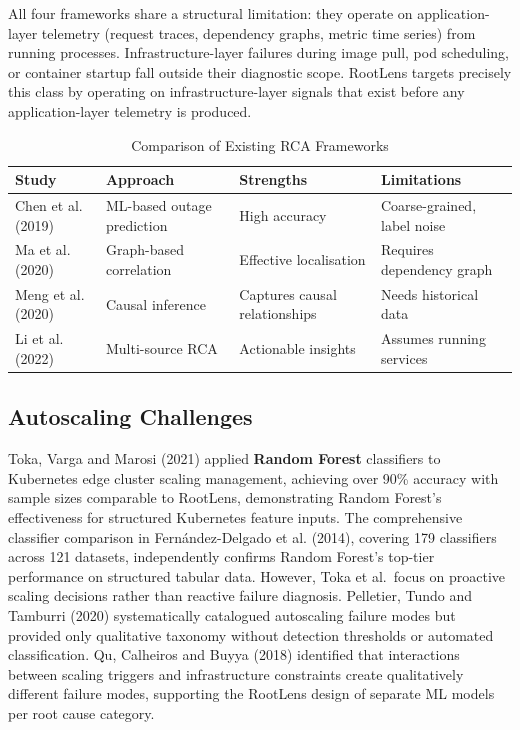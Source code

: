 All four frameworks share a structural limitation: they operate on application-layer telemetry (request traces, dependency graphs, metric time series) from running processes. Infrastructure-layer failures during image pull, pod scheduling, or container startup fall outside their diagnostic scope. RootLens targets precisely this class by operating on infrastructure-layer signals that exist before any application-layer telemetry is produced.

\begin{table}[H]
\centering
\begin{tabularx}{\textwidth}{|X|X|X|X|}
\hline
\textbf{Study} & \textbf{Approach} & \textbf{Strengths} & \textbf{Limitations} \\ \hline

Chen et al. (2019) & ML-based outage prediction & High accuracy & Coarse-grained, label noise \\ \hline

Ma et al. (2020) & Graph-based correlation & Effective localisation & Requires dependency graph \\ \hline

Meng et al. (2020) & Causal inference & Captures causal relationships & Needs historical data \\ \hline

Li et al. (2022) & Multi-source RCA & Actionable insights & Assumes running services \\ \hline

\end{tabularx}
\caption{Comparison of Existing RCA Frameworks}
\end{table}

\subsection{Autoscaling Challenges}
Toka, Varga and Marosi (2021) applied \textbf{Random Forest} classifiers to Kubernetes edge cluster scaling management, achieving over 90\% accuracy with sample sizes comparable to RootLens, demonstrating Random Forest's effectiveness for structured Kubernetes feature inputs. The comprehensive classifier comparison in Fern\'andez-Delgado et al. (2014), covering 179 classifiers across 121 datasets, independently confirms Random Forest's top-tier performance on structured tabular data. However, Toka et al.\ focus on proactive scaling decisions rather than reactive failure diagnosis. Pelletier, Tundo and Tamburri (2020) systematically catalogued autoscaling failure modes but provided only qualitative taxonomy without detection thresholds or automated classification. Qu, Calheiros and Buyya (2018) identified that interactions between scaling triggers and infrastructure constraints create qualitatively different failure modes, supporting the RootLens design of separate ML models per root cause category.


